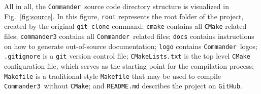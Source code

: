 \documentclass[twocolumn]{aa}
\def\commander{\texttt{Commander}}
\def\commanderthree{\texttt{Commander3}}
\newcommand{\red}[0]{\color{red}}
\begin{document}
All in all, the \commander\ source code directory structure is visualized in Fig.~\ref{fig:source}. In this figure, \texttt{root} represents the root folder of the project, created by the original \texttt{git clone} command; \texttt{cmake} contains all \texttt{CMake} related files; \texttt{commander3} contains all \commander\ related files; \texttt{docs} contains instructions on how to generate out-of-source documentation; \texttt{logo} contains \commander\ logos; \texttt{.gitignore} is a \texttt{git} version control file; \texttt{CMakeLists.txt} is the top level \texttt{CMake} configuration file, which serves as the starting point for the compilation process; \texttt{Makefile} is a traditional-style \texttt{Makefile} that may be used to compile \commanderthree\ without \texttt{CMake}; and \texttt{README.md} describes the project on \texttt{GitHub}.



\end{document}
